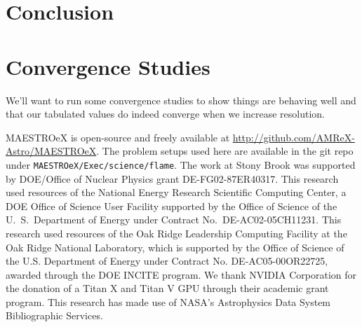 \documentclass[preprint,times,tighten]{aastex63}
\begin{document}
\section{Conclusion}

\section{Convergence Studies}\label{Sec:results}

We'll want to run some convergence studies to show things are behaving well and that our tabulated values do indeed converge when we increase resolution.


\acknowledgements MAESTROeX is open-source and freely available at
\url{http://github.com/AMReX-Astro/MAESTROeX}.  The problem setups used
here are available in the git repo under {\tt MAESTROeX/Exec/science/flame}.
The work at Stony Brook was supported by DOE/Office
of Nuclear Physics grant DE-FG02-87ER40317.  This research used
resources of the National Energy Research Scientific Computing Center,
a DOE Office of Science User Facility supported by the Office of
Science of the U.~S.\ Department of Energy under Contract
No.\ DE-AC02-05CH11231.  This research used resources of the Oak Ridge
Leadership Computing Facility at the Oak Ridge National Laboratory,
which is supported by the Office of Science of the U.S. Department of
Energy under Contract No. DE-AC05-00OR22725, awarded through the DOE
INCITE program.  We thank NVIDIA Corporation for the donation of a
Titan X and Titan V GPU through their academic grant program.  This
research has made use of NASA's Astrophysics Data System Bibliographic
Services.








\end{document}
